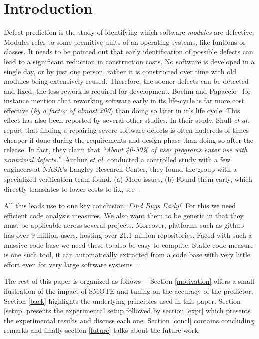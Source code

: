 \documentclass[12pt, journal, compsoc]{IEEEtran}
\begin{document}
\section{Introduction}
Defect prediction is the study of identifying which software \textit{modules} are defective. Modules refer to some premitive units of an operating systems, like funtions or classes. It needs to be pointed out that early identification of possible defects can lead to a significant reduction in construction costs. No software is developed in a single day, or by just one person, rather it is constructed over time with old modules being extensively reused. Therefore, the sooner defects can be detected and fixed, the less rework is required for development. Boehm and Papaccio~\cite{boehm88} for instance mention that reworking software early in its life-cycle is far more cost effective (\textit{by a factor of almost 200}) than doing so later in it's life cycle. This effect has also been reported by several other studies. In their study, Shull \textit{et al.}~\cite{shull2002we} report that finding a repairing severe software defects is often hudereds of times cheaper if done during the requirements and design phase than doing so after the release. In fact, they claim that \textit{``About 40-50\% of user programs enter use with
nontrivial defects.''}. Authur \textit{et al.} \cite{arthur99} conducted a controlled study with a few engineers at NASA's Langley Research Center, they found the group with a specialized verification team found, (a) More issues, (b) Found them early, which directly translates to lower costs to fix, see~\cite{dabney2006predicting}. 

All this leads use to one key conclusion: \textit{Find Bugs Early!}. For this we need efficient code analysis measures. We also want them to be generic in that they must be applicable across several projects. Moreover, platforms such as github has over 9 million users, hosting over 21.1 million repositories. Faced with such a massive code base we need these to also be easy to compute. Static code measure is one such tool, it can automatically extracted from a code base with very little effort even for very large software systems~\cite{nagappan2005static}.

The rest of this paper is organized as follows--- Section \ref*{motivation} offers a small ilustration of the impact of SMOTE and tuning on the accuracy of the predictor. Section \ref*{back} highlights the underlying principles used in this paper. Section \ref{setup} presents the experimental setup followed by section \ref{expt} which presents the experimental results and discuss each one. Section \ref{concl} contains concluding remarks and finally section \ref{future} talks about the future work.
\end{document}
